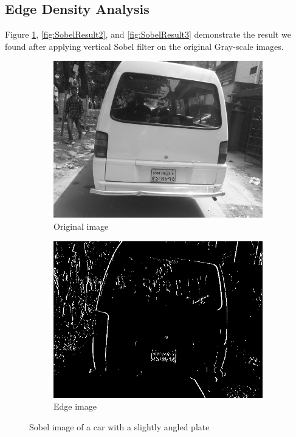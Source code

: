 \subsection{Edge Density Analysis}
Figure \ref{fig:SobelResult1}, \ref{fig:SobelResult2}, and \ref{fig:SobelResult3} demonstrate the result we found after applying vertical Sobel filter on the original Gray-scale images.

\begin{figure}
\begin{subfigure}{0.5\textwidth}
    \centering
    \includegraphics[width=0.9\linewidth]{./img/experiment/stage.2/angle}
    \caption{Original image}
\end{subfigure}
\begin{subfigure}{0.5\textwidth}
    \centering
    \includegraphics[width=0.9\linewidth]{./img/experiment/stage.3/angle}
    \caption{Edge image}
\end{subfigure}
\caption{Sobel image of a car with a slightly angled plate}
\label{fig:SobelResult1}
\end{figure}

